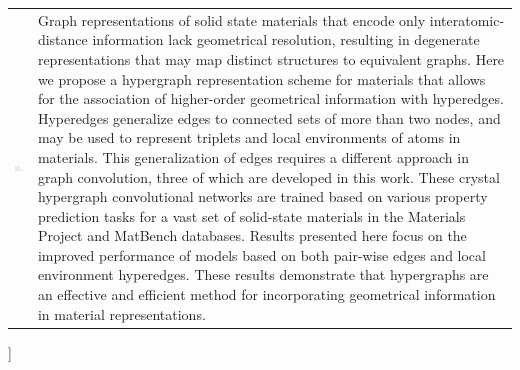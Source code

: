 \documentclass[twoside,twocolumn,9pt]{article}
\begin{document}
\begin{@twocolumnfalse}
\begin{tabular}{m{4.5cm} p{13.5cm} }
\includegraphics{head_foot/dates} & \noindent\normalsize{Graph representations of solid state materials that encode only interatomic-distance information lack geometrical resolution, resulting in degenerate representations that may map distinct structures to equivalent graphs. Here we propose a hypergraph representation scheme for materials that allows for the association of higher-order geometrical information with hyperedges. Hyperedges generalize edges to connected sets of more than two nodes, and may be used to represent triplets and local environments of atoms in materials. This generalization of edges requires a different approach in graph convolution, three of which are developed in this work. These crystal hypergraph convolutional networks are trained based on various property prediction tasks for a vast set of solid-state materials in the Materials Project and MatBench databases. Results presented here focus on the improved performance of models based on both pair-wise edges and local environment hyperedges. These results demonstrate that hypergraphs are an effective and efficient method for incorporating geometrical information in material representations.} \\%

\end{tabular}

 \end{@twocolumnfalse} \vspace{0.6cm}

  ]

\renewcommand*\rmdefault{bch}\normalfont\upshape
\rmfamily
\section*{}
\vspace{-1cm}



\end{document}
